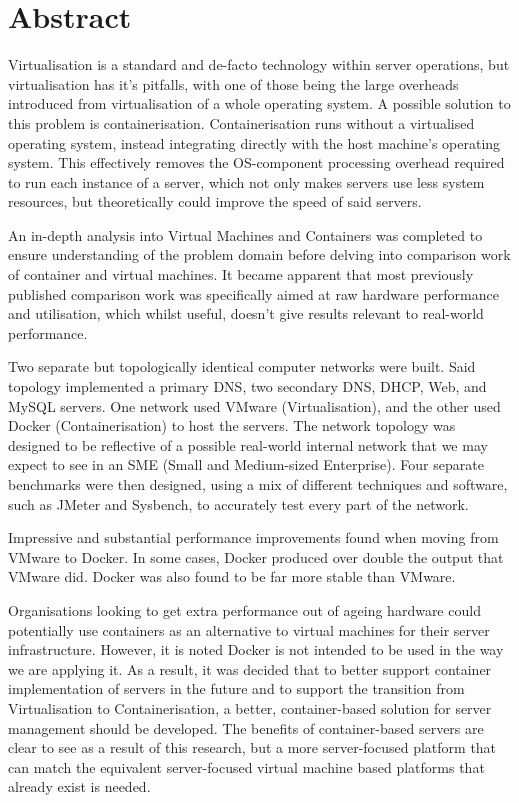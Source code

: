 
\chapter{Abstract}
Virtualisation is a standard and de-facto technology within server operations, but virtualisation has it's pitfalls, with one of those being the large overheads introduced from virtualisation of a whole operating system. A possible solution to this problem is containerisation. Containerisation runs without a virtualised operating system, instead integrating directly with the host machine's operating system. This effectively removes the OS-component processing overhead required to run each instance of a server, which not only makes servers use less system resources, but theoretically could improve the speed of said servers.

An in-depth analysis into Virtual Machines and Containers was completed to ensure understanding of the problem domain before delving into comparison work of container and virtual machines. It became apparent that most previously published comparison work was specifically aimed at raw hardware performance and utilisation, which whilst useful, doesn't give results relevant to real-world performance.

Two separate but topologically identical computer networks were built. Said topology implemented a primary DNS, two secondary DNS, DHCP, Web, and MySQL servers. One network used VMware (Virtualisation), and the other used Docker (Containerisation) to host the servers. The network topology was designed to be reflective of a possible real-world internal network that we may expect to see in an SME (Small and Medium-sized Enterprise). Four separate benchmarks were then designed, using a mix of different techniques and software, such as JMeter and Sysbench, to accurately test every part of the network.

 Impressive and substantial performance improvements found when moving from VMware to Docker. In some cases, Docker produced over double the output that VMware did. Docker was also found to be far more stable than VMware.

Organisations looking to get extra performance out of ageing hardware could potentially use containers as an alternative to virtual machines for their server infrastructure. However, it is noted Docker is not intended to be used in the way we are applying it. As a result, it was decided that to better support container implementation of servers in the future and to support the transition from Virtualisation to Containerisation, a better, container-based solution for server management should be developed. The benefits of container-based servers are clear to see as a result of this research, but a more server-focused platform that can match the equivalent server-focused virtual machine based platforms that already exist is needed.